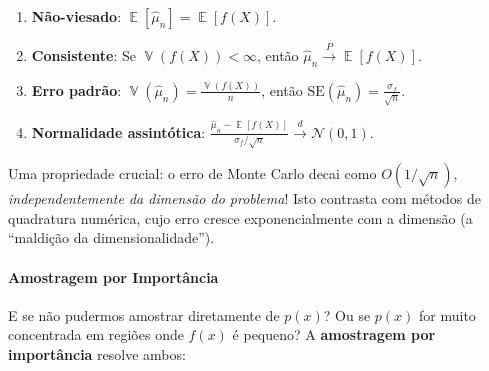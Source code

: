 \documentclass{tufte-handout}
\DeclareMathOperator{\E}{\mathbb{E}}
\DeclareMathOperator{\Var}{\mathbb{V}}
\begin{document}
\begin{prop}
    \begin{enumerate}
        \item \textbf{Não-viesado}: $\E[\hat{\mu}_n] = \E[f(X)]$.
        \item \textbf{Consistente}: Se $\Var(f(X)) < \infty$, então $\hat{\mu}_n \xrightarrow{P} \E[f(X)]$.
        \item \textbf{Erro padrão}: $\Var(\hat{\mu}_n) = \frac{\Var(f(X))}{n}$,
        então $\text{SE}(\hat{\mu}_n) = \frac{\sigma_f}{\sqrt{n}}$.
        \item \textbf{Normalidade assintótica}: $\frac{\hat{\mu}_n - \E[f(X)]}{\sigma_f/\sqrt{n}} \xrightarrow{d} \mathcal{N}(0, 1)$.
    \end{enumerate}
\end{prop}

Uma propriedade crucial: o erro de Monte Carlo decai como $O(1/\sqrt{n})$,
\textit{independentemente da dimensão do problema}! Isto contrasta com métodos de
quadratura numérica, cujo erro cresce exponencialmente com a dimensão
(a ``maldição da dimensionalidade'').

\begin{marginfigure}
\centering
{}
\caption{Taxa de convergência do erro de Monte Carlo vs. quadratura numérica em 1D.
Em dimensão alta, a quadratura torna-se inviável; MC não.}
\end{marginfigure}

\paragraph{Amostragem por Importância}

E se não pudermos amostrar diretamente de $p(x)$? Ou se $p(x)$ for muito concentrada
em regiões onde $f(x)$ é pequeno? A \textbf{amostragem por importância} resolve ambos:
\end{document}
